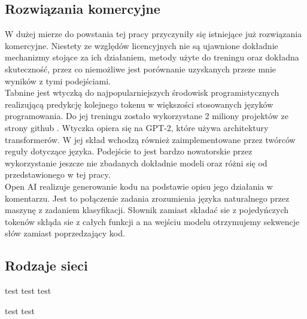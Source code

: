 \subsection {Rozwiązania komercyjne}
W dużej mierze do powstania tej pracy przyczyniły się istniejące już rozwiązania komercyjne. Niestety 
ze względów licencyjnych nie są ujawnione dokładnie mechanizmy stojące za ich działaniem, metody użyte 
do treningu oraz dokładna skuteczność, przez co niemożliwe jest porównanie uzyskanych przeze mnie wyników 
z tymi podejściami. \\

Tabnine \cite{tabnine} jest wtyczką do najpopularniejszych środowisk programistycznych realizującą predykcję kolejnego tokenu w 
większości stosowanych języków programowania. Do jej treningu zostało wykorzystane 2 miliony projektów ze strony github \cite{github}. 
Wtyczka opiera się na GPT-2, które używa architektury transformerów. W jej skład wchodzą również zaimplementowane przez twórców
reguły dotyczące języka. Podejście to jest bardzo nowatorskie przez wykorzystanie jeszcze nie zbadanych dokładnie modeli oraz 
różni się od przedstawionego w tej pracy.\\

Open AI realizuje generowanie kodu na podstawie opisu jego działania w komentarzu. Jest to połączenie zadania zrozumienia 
języka naturalnego przez maszynę z zadaniem klasyfikacji. Słownik zamiast składać sie z pojedyńczych tokenów skłąda sie z całych funkcji 
a na wejściu modelu otrzymujemy sekwencje słów zamiast poprzedzający kod. 

\subsection {Rodzaje sieci}
test test test 

test test 

